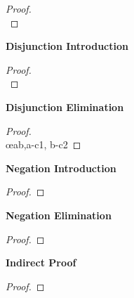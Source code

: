 \newpage
\begin{multicols}{2}
\begin{proof}
\\	
	 
\end{proof}


\vspace{1em}\noindent\textbf{Disjunction Introduction}

\begin{proof}

\\	
\end{proof}

\vspace{1em}\noindent\textbf{Disjunction Elimination}

\begin{proof}
\\	\open
	\close
	\open
	\close
	 \oe{ab,a-c1, b-c2}
\end{proof}

\vspace{1em}\noindent\textbf{Negation Introduction}

\begin{proof}
	\open
	\close
\end{proof}


\vspace{1em}\noindent\textbf{Negation Elimination}

\begin{proof}
\end{proof}

\vspace{1em}\noindent\textbf{Indirect Proof}

\begin{proof}
	\open
	\close
\end{proof}

\end{multicols}

